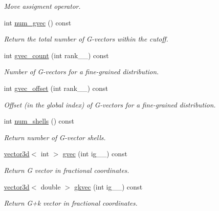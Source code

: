 \begin{DoxyCompactItemize}
\begin{DoxyCompactList}\small\item\em Move assigment operator. \end{DoxyCompactList}\item 
int \hyperlink{classsddk_1_1_gvec_aefe301dc5eeb4db682b760d61a4f5ac3}{num\+\_\+gvec} () const 
\begin{DoxyCompactList}\small\item\em Return the total number of G-\/vectors within the cutoff. \end{DoxyCompactList}\item 
int \hyperlink{classsddk_1_1_gvec_a74f50870731ddee098904f54d85a3865}{gvec\+\_\+count} (int rank\+\_\+\+\_\+) const 
\begin{DoxyCompactList}\small\item\em Number of G-\/vectors for a fine-\/grained distribution. \end{DoxyCompactList}\item 
int \hyperlink{classsddk_1_1_gvec_a138f923bee02db11e9bb6e85457835e9}{gvec\+\_\+offset} (int rank\+\_\+\+\_\+) const 
\begin{DoxyCompactList}\small\item\em Offset (in the global index) of G-\/vectors for a fine-\/grained distribution. \end{DoxyCompactList}\item 
int \hyperlink{classsddk_1_1_gvec_ac9e3cb03d19f07388a3f14fcea811ace}{num\+\_\+shells} () const 
\begin{DoxyCompactList}\small\item\em Return number of G-\/vector shells. \end{DoxyCompactList}\item 
\hyperlink{classgeometry3d_1_1vector3d}{vector3d}$<$ int $>$ \hyperlink{classsddk_1_1_gvec_a9c2c82147743329138872c39e5abd7c4}{gvec} (int ig\+\_\+\+\_\+) const 
\begin{DoxyCompactList}\small\item\em Return G vector in fractional coordinates. \end{DoxyCompactList}\item 
\hyperlink{classgeometry3d_1_1vector3d}{vector3d}$<$ double $>$ \hyperlink{classsddk_1_1_gvec_a846c80a978fe4a152f0b798b22818f7d}{gkvec} (int ig\+\_\+\+\_\+) const 
\begin{DoxyCompactList}\small\item\em Return G+k vector in fractional coordinates. \end{DoxyCompactList}\item 

\end{DoxyCompactItemize}
